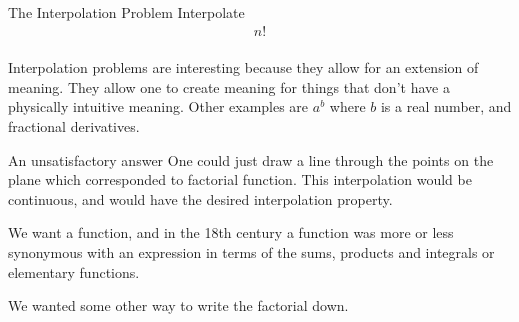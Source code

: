 \documentclass[pdf]{beamer}
\begin{document}
\begin{frame}{The Interpolation Problem}
    Interpolate
    \begin{align*}
        n!
    \end{align*}
    \\
    Interpolation problems are interesting because they allow for an extension of meaning. They allow one to create meaning for things that don't have a physically intuitive meaning. Other examples are $ a^b $ where $ b $ is a real number, and fractional derivatives.
\end{frame}

\begin{frame}{An unsatisfactory answer}
    One could just draw a line through the points on the plane which corresponded to factorial function. This interpolation would be continuous, and would have the desired interpolation property. 

We want a function, and in the 18th century a function was more or less synonymous with an expression in terms of the sums, products and integrals or elementary functions. 

We wanted some other way to write the factorial down. 

\end{frame}
\end{document}
